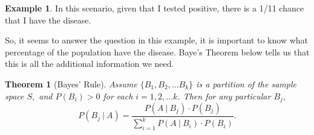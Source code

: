 \documentclass[
]{book}
\newtheorem{theorem}{Theorem}[chapter]
\theoremstyle{definition}
\theoremstyle{definition}
\newtheorem{example}{Example}[chapter]
\theoremstyle{definition}
\theoremstyle{definition}
\theoremstyle{remark}
\begin{document}
\begin{example}
In this scenario, given that I tested positive, there is a 1/11 chance that I have the disease.

So, it seems to answer the question in this example, it is important to know what percentage of the population have the disease. Baye's Theorem below tells us that this is all the additional information we need.
\end{example}

\begin{theorem}[Bayes' Rule]
\protect\hypertarget{thm:Bayes-rule}{}\label{thm:Bayes-rule}Assume \(\{B_1, B_2, \ldots B_k\}\) is a partition of the sample space \(S,\) and \(P(B_i) > 0\) for each \(i = 1, 2, \ldots k\). Then for any particular \(B_j,\) \[P(B_j ~|~ A) = \frac{P(A~|~B_j)\cdot P(B_j)}{\sum_{i=1}^k P(A~|~B_i)\cdot P(B_i)}.\]
\end{theorem}
\end{document}
